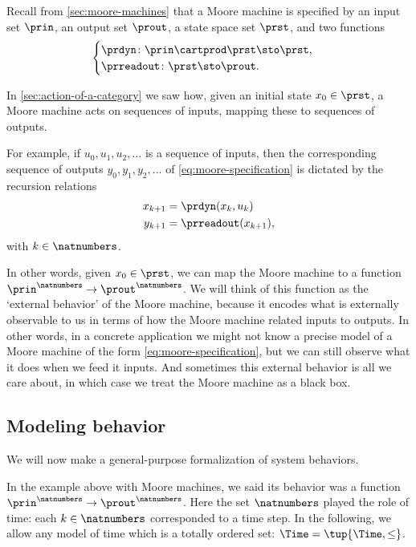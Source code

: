 
Recall from \cref{sec:moore-machines} that a Moore machine is specified by an input set $\prin$, an output set $\prout$, a state space set $\prst$, and two functions
\begin{equation}\label{eq:moore-specification}
    \begin{cases}
        \prdyn \colon \prin \cartprod \prst \sto \prst, \\
        \prreadout \colon \prst \sto \prout.
    \end{cases}
\end{equation}

In \cref{sec:action-of-a-category} we saw how, given an initial state $x_0 \in \prst$, a Moore machine acts on sequences of inputs, mapping these to sequences of outputs. 

For example, if $u_0, u_1, u_2, ... $ is a sequence of inputs, then the corresponding sequence of outputs $y_0, y_1, y_2, ... $ of \cref{eq:moore-specification} is dictated by the recursion relations
\begin{align}
x_{k+1} &= \prdyn(x_k, u_k) \\
y_{k+1} &= \prreadout(x_{k+1}),
\end{align}
with $k \in \natnumbers$. 

In other words, given $x_0 \in \prst$, we can map the Moore machine \label{eq:moore-again} to a function $\prin^\natnumbers \to \prout^\natnumbers$. We will think of this function as the `external behavior' of the Moore machine, because it encodes what is externally observable to us in terms of how the Moore machine related inputs to outputs. In other words, in a concrete application we might not know a precise model of a Moore machine of the form \cref{eq:moore-specification}, but we can still observe what it does when we feed it inputs. And sometimes this external behavior is all we care about, in which case we treat the Moore machine as a black box. 

\subsection{Modeling behavior}

We will now make a general-purpose formalization of system behaviors. 

In the example above with Moore machines, we said its behavior was a function $\prin^\natnumbers \to \prout^\natnumbers$. Here the set $\natnumbers$ played the role of time: each $k \in \natnumbers$ corresponded to a time step. In the following, we allow any model of time which is a totally ordered set: $\Time = \tup{\Time, \leq}$. 

